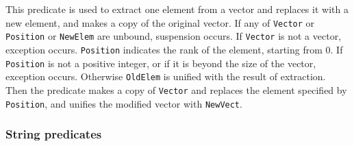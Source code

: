 \begin{itemize}
This predicate is used to extract one element from a vector and
replaces it with a new element, and makes a copy of the original vector.
If any of \verb|Vector| or \verb|Position| or \verb|NewElem| are unbound,
suspension occurs.
If \verb|Vector| is not a vector, exception occurs.
\verb|Position| indicates the rank of the element, starting from 0.
If \verb|Position| is not a positive integer, 
or if it is beyond the size of the vector, exception occurs.
Otherwise \verb|OldElem| is unified with the result of extraction.
Then the predicate makes a copy of \verb|Vector| and replaces the element 
specified by \verb|Position|, and unifies the modified vector 
with \verb|NewVect|.

\end{itemize}
\subsubsection{String predicates}
